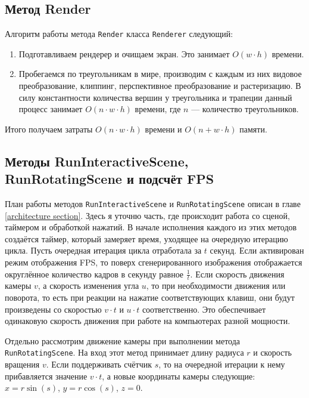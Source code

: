 \documentclass{article}
\begin{document}
\subsection{Метод Render}

Алгоритм работы метода \verb"Render" класса \verb"Renderer" следующий:
\begin{enumerate}
	\item Подготавливаем рендерер и очищаем экран.
	Это занимает $O(w \cdot h)$ времени.
	\item Пробегаемся по треугольникам в мире, производим с каждым из них видовое преобразование, клиппинг, перспективное преобразование и растеризацию.
	В силу константности количества вершин у треугольника и трапеции данный процесс занимает $O(n \cdot w \cdot h)$ времени, где $n$ --- количество треугольников.
\end{enumerate}

Итого получаем затраты $O(n \cdot w \cdot h)$ времени и $O(n + w \cdot h)$ памяти.

\subsection{Методы RunInteractiveScene, RunRotatingScene и подсчёт FPS}

План работы методов \verb"RunInteractiveScene" и \verb"RunRotatingScene" описан в главе \ref{architecture section}.
Здесь я уточню часть, где происходит работа со сценой, таймером и обработкой нажатий.
В начале исполнения каждого из этих методов создаётся таймер, который замеряет время, уходящее на очередную итерацию цикла.
Пусть очередная итерация цикла отработала за $t$ секунд.
Если активирован режим отображения FPS, то поверх сгенерированного изображения отображается округлённое количество кадров в секунду равное $\frac{1}{t}$.
Если скорость движения камеры $v$, а скорость изменения угла $u$, то при необходимости движения или поворота, то есть при реакции на нажатие соответствующих клавиш, они будут произведены со скоростью $v \cdot t$ и $u \cdot t$ соответственно.
Это обеспечивает одинаковую скорость движения при работе на компьютерах разной мощности.

Отдельно рассмотрим движение камеры при выполнении метода \verb"RunRotatingScene".
На вход этот метод принимает длину радиуса $r$ и скорость вращения $v$.
Если поддерживать счётчик $s$, то на очередной итерации к нему прибавляется значение $v \cdot t$, а новые координаты камеры следующие: $x = r \sin(s)$, $y = r \cos(s)$, $z = 0$.
\end{document}

